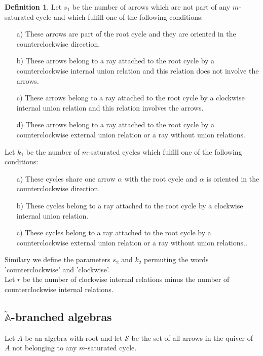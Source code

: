 \documentclass{amsart}
\theoremstyle{plain}
\theoremstyle{definition}
\newtheorem{defi}[teo]{Definition}
\begin{document}
\begin{defi}\cite[Definition 7.2]{Gub1}
Let $s_1$ be the number of arrows which are not part of any $m$-saturated cycle and which fulfill one of the following conditions:

\begin{itemize}
  \item  [a)] These arrows are part of the root cycle and they are oriented in the counterclockwise direction.
  \item  [b)] These arrows belong to a ray attached to the root cycle by a counterclockwise internal union relation and this relation does not involve the arrows.
  \item  [c)] These arrows belong to a ray attached to the root cycle by a clockwise internal union relation and this relation  involves the arrows.
  \item  [d)] These arrows belong to a ray attached to the root cycle by a counterclockwise external union relation or a ray without union relations.
\end{itemize}

Let $k_1$ be the number of  $m$-saturated cycles  which fulfill one of the following conditions:

\begin{itemize}
  \item  [a)] These cycles share one arrow $\alpha$ with the root cycle and $\alpha$ is oriented in the counterclockwise direction.
  \item  [b)] These cycles belong to a ray attached to the root cycle by a clockwise internal union relation.
  \item  [c)] These cycles belong to a ray attached to the root cycle by a counterclockwise external union relation or a ray without union relations..
\end{itemize}

Similary we define the parameters $s_2$ and $k_2$   permuting the words  'counterclockwise' and 'clockwise'.\\
Let $r$ be the number of clockwise internal relations minus the number of counterclockwise internal relations.
\end{defi}

\subsection{$\widetilde{\mathbb{A}}$-branched algebras}

Let $A$ be an algebra with root and let $\mathcal{S}$ be the set of all arrows in the quiver of $A$ not belonging to any   $m$-saturated cycle.\\
\end{document}
